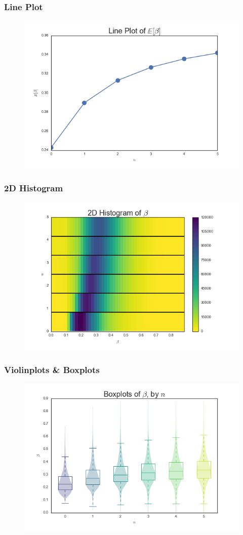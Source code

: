 \documentclass{beamer}
\begin{document}
\begin{frame}
\frametitle{Line Plot}
\begin{figure}
	\includegraphics[width=\textwidth]{lineplotmeans}
\end{figure}
\end{frame}

\begin{frame}
\frametitle{2D Histogram}
\begin{figure}
	\includegraphics[width=\textwidth]{2dhist}
\end{figure}
\end{frame}

\begin{frame}
\frametitle{Violinplots \& Boxplots}
\begin{figure}
	\includegraphics[width=\textwidth]{violins}
\end{figure}
\end{frame}
\end{document}
